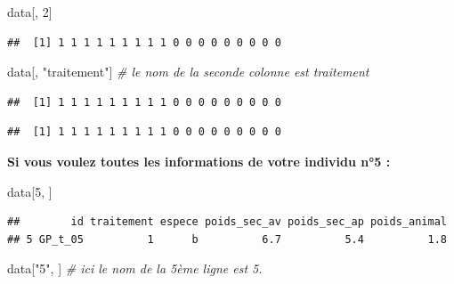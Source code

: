 \documentclass[
]{article}
\newenvironment{Shaded}{\begin{snugshade}}{\end{snugshade}}
\newcommand{\CommentTok}[1]{\textcolor[rgb]{0.56,0.35,0.01}{\textit{#1}}}
\newcommand{\DecValTok}[1]{\textcolor[rgb]{0.00,0.00,0.81}{#1}}
\newcommand{\NormalTok}[1]{#1}
\newcommand{\OperatorTok}[1]{\textcolor[rgb]{0.81,0.36,0.00}{\textbf{#1}}}
\newcommand{\StringTok}[1]{\textcolor[rgb]{0.31,0.60,0.02}{#1}}
\begin{document}
\begin{Shaded}
\begin{Highlighting}[]
\NormalTok{data[, }\DecValTok{2}\NormalTok{]}
\end{Highlighting}
\end{Shaded}

\begin{verbatim}
##  [1] 1 1 1 1 1 1 1 1 1 0 0 0 0 0 0 0 0 0
\end{verbatim}

\begin{Shaded}
\begin{Highlighting}[]
\NormalTok{data[, }\StringTok{"traitement"}\NormalTok{] }\CommentTok{# le nom de la seconde colonne est traitement}
\end{Highlighting}
\end{Shaded}

\begin{verbatim}
##  [1] 1 1 1 1 1 1 1 1 1 0 0 0 0 0 0 0 0 0
\end{verbatim}

\begin{Shaded}
\end{Shaded}

\begin{verbatim}
##  [1] 1 1 1 1 1 1 1 1 1 0 0 0 0 0 0 0 0 0
\end{verbatim}

\textbf{Si vous voulez toutes les informations de votre individu n°5 :}

\begin{Shaded}
\begin{Highlighting}[]
\NormalTok{data[}\DecValTok{5}\NormalTok{, ]}
\end{Highlighting}
\end{Shaded}

\begin{verbatim}
##        id traitement espece poids_sec_av poids_sec_ap poids_animal
## 5 GP_t_05          1      b          6.7          5.4          1.8
\end{verbatim}

\begin{Shaded}
\begin{Highlighting}[]
\NormalTok{data[}\StringTok{"5"}\NormalTok{, ] }\CommentTok{# ici le nom de la 5ème ligne est 5.}
\end{Highlighting}
\end{Shaded}
\end{document}
